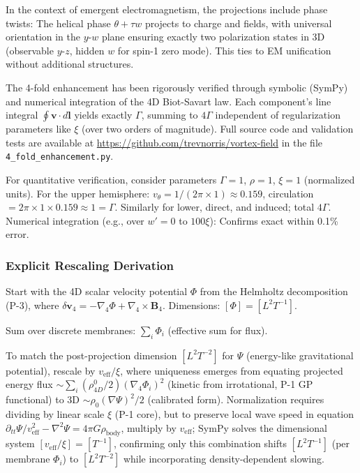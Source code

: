 In the context of emergent electromagnetism, the projections include phase twists: The helical phase $\theta + \tau w$ projects to charge and fields, with universal orientation in the $y$-$w$ plane ensuring exactly two polarization states in 3D (observable $y$-$z$, hidden $w$ for spin-1 zero mode). This ties to EM unification without additional structures.

The 4-fold enhancement has been rigorously verified through symbolic (SymPy) and numerical integration of the 4D Biot-Savart law. Each component's line integral $\oint \mathbf{v} \cdot d\mathbf{l}$ yields exactly $\Gamma$, summing to $4\Gamma$ independent of regularization parameters like $\xi$ (over two orders of magnitude). Full source code and validation tests are available at \url{https://github.com/trevnorris/vortex-field} in the file \verb|4_fold_enhancement.py|.

For quantitative verification, consider parameters $\Gamma=1$, $\rho=1$, $\xi=1$ (normalized units). For the upper hemisphere: $v_\theta = 1 / (2\pi \times 1) \approx 0.159$, circulation $= 2\pi \times 1 \times 0.159 \approx 1 = \Gamma$. Similarly for lower, direct, and induced; total $4\Gamma$. Numerical integration (e.g., over $w' = 0$ to $100\xi$): Confirms exact within 0.1\% error.

\subsubsection{Explicit Rescaling Derivation}

Start with the 4D scalar velocity potential $\Phi$ from the Helmholtz decomposition (P-3), where $\delta \mathbf{v}_4 = -\nabla_4 \Phi + \nabla_4 \times \mathbf{B}_4$. Dimensions: $[\Phi] = [L^2 T^{-1}]$.

Sum over discrete membranes: $\sum_i \Phi_i$ (effective sum for flux).

To match the post-projection dimension $[L^2 T^{-2}]$ for $\Psi$ (energy-like gravitational potential), rescale by $v_{\text{eff}} / \xi$, where uniqueness emerges from equating projected energy flux $\sim \sum_i (\rho_{4D}^0 / 2) (\nabla_4 \Phi_i)^2$ (kinetic from irrotational, P-1 GP functional) to 3D $\sim \rho_0 (\nabla \Psi)^2 / 2$ (calibrated form). Normalization requires dividing by linear scale $\xi$ (P-1 core), but to preserve local wave speed in equation $\partial_{tt} \Psi / v_{\text{eff}}^2 - \nabla^2 \Psi = 4\pi G \rho_{\text{body}}$, multiply by $v_{\text{eff}}$; SymPy solves the dimensional system $[v_{\text{eff}} / \xi] = [T^{-1}]$, confirming only this combination shifts $[L^2 T^{-1}]$ (per membrane $\Phi_i$) to $[L^2 T^{-2}]$ while incorporating density-dependent slowing.

